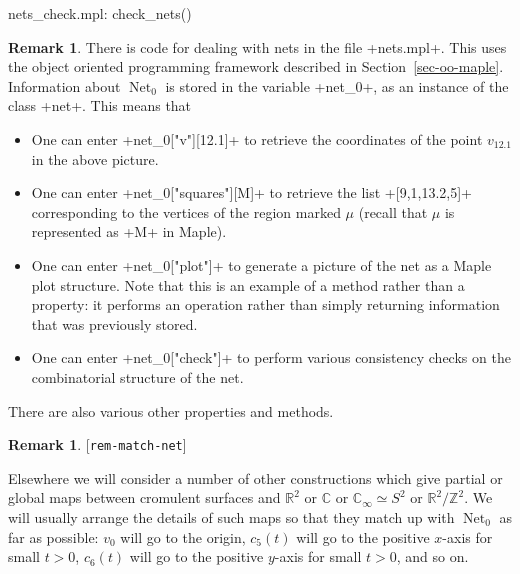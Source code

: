 \documentclass[reqno]{amsart}
\newcommand{\lbl}[1]{\label{#1}\textup{[\texttt{#1}]}\par}
\newcommand{\lbl}{\label}
\newcommand{\Net}	{\operatorname{Net}}
\newcommand{\lm}        {\lambda}
\newcommand{\Z}         {{\mathbb{Z}}}
\newcommand{\R}         {{\mathbb{R}}}
\newcommand{\C}         {{\mathbb{C}}}
\renewcommand{\ss}{\scriptstyle}
\renewcommand{\:}{\colon}
\theoremstyle{definition}
\newtheorem{remark}[theorem]{Remark}
\begin{document}
\begin{center}
\end{center}
\begin{checks}
 nets_check.mpl: check_nets()
\end{checks}
\begin{remark}
 There is code for dealing with nets in the file \fname+nets.mpl+.
 This uses the object oriented programming framework described in
 Section~\ref{sec-oo-maple}.  Information about $\Net_0$ is stored in
 the variable \mcode+net_0+, as an instance of the class \mcode+net+.
 This means that
 \begin{itemize}
  \item One can enter \mcode+net_0["v"][12.1]+ to retrieve the
   coordinates of the point $v_{12.1}$ in the above picture.
  \item One can enter \mcode+net_0["squares"][M]+ to retrieve the list
   \mcode+[9,1,13.2,5]+ corresponding to the vertices of the region
   marked $\mu$ (recall that $\mu$ is represented as \mcode+M+ in Maple).
  \item One can enter \mcode+net_0["plot"]+ to generate a picture of
   the net as a Maple plot structure.  Note that this is an example of
   a method rather than a property: it performs an operation rather
   than simply returning information that was previously stored.
  \item One can enter \mcode+net_0["check"]+ to perform various
   consistency checks on the combinatorial structure of the net.
 \end{itemize}
 There are also various other properties and methods.
\end{remark}

\begin{remark}\lbl{rem-match-net}
 Elsewhere we will consider a number of other constructions which give
 partial or global maps between cromulent surfaces and $\R^2$ or $\C$
 or $\C_\infty\simeq S^2$ or $\R^2/\Z^2$.  We will usually arrange the
 details of such maps so that they match up with $\Net_0$ as far as
 possible: $v_0$ will go to the origin, $c_5(t)$ will go to the
 positive $x$-axis for small $t>0$, $c_6(t)$ will go to the positive
 $y$-axis for small $t>0$, and so on.
\end{remark}
\end{document}
